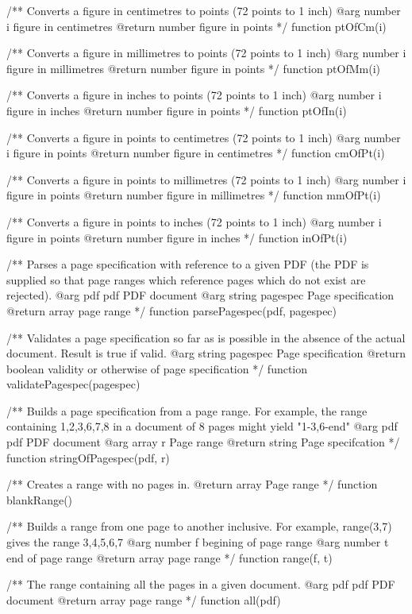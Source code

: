/** Converts a figure in centimetres to points (72 points to 1 inch)
@arg {number} i figure in centimetres
@return {number} figure in points */
function ptOfCm(i) {}

/** Converts a figure in millimetres to points (72 points to 1 inch)
@arg {number} i figure in millimetres
@return {number} figure in points */
function ptOfMm(i) {}

/** Converts a figure in inches to points (72 points to 1 inch)
@arg {number} i figure in inches
@return {number} figure in points */
function ptOfIn(i) {}

/** Converts a figure in points to centimetres (72 points to 1 inch)
@arg {number} i figure in points
@return {number} figure in centimetres */
function cmOfPt(i) {}

/** Converts a figure in points to millimetres (72 points to 1 inch)
@arg {number} i figure in points
@return {number} figure in millimetres */
function mmOfPt(i) {}

/** Converts a figure in points to inches (72 points to 1 inch)
@arg {number} i figure in points 
@return {number} figure in inches */
function inOfPt(i) {}

/** Parses a page specification with reference to a given PDF (the PDF is
supplied so that page ranges which reference pages which do not exist are
rejected).
@arg {pdf} pdf PDF document
@arg {string} pagespec Page specification
@return {array} page range */
function parsePagespec(pdf, pagespec) {}

/** Validates a page specification so far as is possible in the absence of
the actual document. Result is true if valid.
@arg {string} pagespec Page specification
@return {boolean} validity or otherwise of page specification */
function validatePagespec(pagespec) {}

/** Builds a page specification from a page range. For example, the range
containing 1,2,3,6,7,8 in a document of 8 pages might yield "1-3,6-end"
@arg {pdf} pdf PDF document
@arg {array} r Page range
@return {string} Page specifcation */
function stringOfPagespec(pdf, r) {}

/** Creates a range with no pages in.
@return {array} Page range */
function blankRange() {}

/** Builds a range from one page to another inclusive. For example, range(3,7)
gives the range 3,4,5,6,7
@arg {number} f begining of page range
@arg {number} t end of page range
@return {array} page range */
function range(f, t) {}

/** The range containing all the pages in a given document.
@arg {pdf} pdf PDF document
@return {array} page range */
function all(pdf) {}

